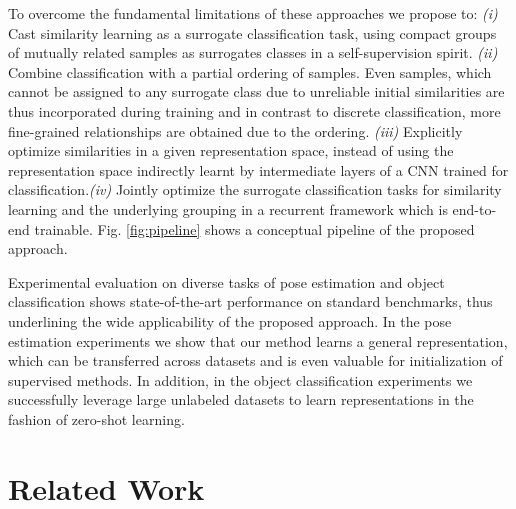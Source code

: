 \documentclass[10pt,twocolumn,letterpaper]{article}
\begin{document}
To overcome the fundamental limitations of these approaches we propose to: \emph{(i)} Cast similarity learning as a surrogate classification task, using compact groups of mutually related samples as surrogates classes in a self-supervision spirit. \emph{(ii)} Combine classification with a partial ordering of samples. Even samples, which cannot be assigned to any surrogate class due to unreliable initial similarities are thus incorporated during training and in contrast to discrete classification, more fine-grained relationships are obtained due to the ordering. \emph{(iii)} Explicitly optimize similarities in a given representation space, instead of using the representation space indirectly learnt by intermediate layers of a CNN trained for classification.\emph{(iv)} Jointly optimize the surrogate classification tasks for similarity learning and the underlying grouping in a recurrent framework which is end-to-end trainable. Fig. \ref{fig:pipeline} shows a conceptual pipeline of the proposed approach.

Experimental evaluation on diverse tasks of pose estimation and object classification shows state-of-the-art performance on standard benchmarks, thus underlining the wide applicability of the proposed approach. In the pose estimation experiments we show that our method learns a general representation, which can be transferred across datasets and is even valuable for initialization of supervised methods. In addition, in the object classification experiments we successfully leverage large unlabeled datasets to learn representations in the fashion of zero-shot learning.


\section{Related Work}
\end{document}
